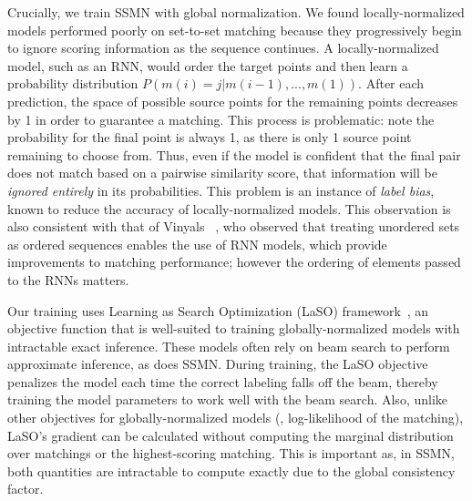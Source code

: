 \documentclass[10pt,twocolumn,letterpaper]{article}
\begin{document}
Crucially, we train SSMN with global normalization. We found locally-normalized models performed poorly on set-to-set matching because they progressively begin to ignore scoring information as the sequence continues. A locally-normalized model, such as an RNN, would order the target points and then learn a probability distribution $P(m(i) = j | m(i-1), ..., m(1))$. After each prediction, the space of possible source points for the remaining points decreases by 1 in order to guarantee a matching. This process is problematic: note the probability for the final point is always 1, as there is only 1 source point remaining to choose from. Thus, even if the model is confident that the final pair does not match based on a pairwise similarity score, that information will be \emph{ignored entirely} in its probabilities. This problem is an instance of \emph{label bias}\cite{lafferty2001conditional}, known to reduce the accuracy of locally-normalized models. This observation is also consistent with that of Vinyals \etal~\cite{Vinyals2015OrderMS, vinyalsBLKW16}, who observed that treating unordered sets as ordered sequences enables the use of RNN models, which provide improvements to matching performance; however the ordering of elements passed to the RNNs matters.

Our training uses Learning as Search Optimization (LaSO) framework~\cite{Daume2005}, an objective function that is well-suited to training globally-normalized models with intractable exact inference. These models often rely on beam search to perform approximate inference, as does SSMN. During training, the LaSO objective penalizes the model each time the correct labeling falls off the beam, thereby training the model parameters to work well with the beam search. Also, unlike other objectives for globally-normalized models (\eg, log-likelihood of the matching), LaSO's gradient can be calculated without computing the marginal distribution over matchings or the highest-scoring matching. This is important as, in SSMN, both quantities are intractable to compute exactly due to the global consistency factor.
\end{document}
